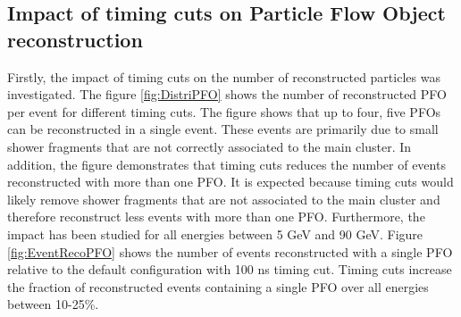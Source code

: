 \subsection{Impact of timing cuts on Particle Flow Object reconstruction}

Firstly, the impact of timing cuts on the number of reconstructed particles was investigated. The figure \ref{fig:DistriPFO} shows the number of reconstructed PFO per event for different timing cuts. The figure shows that up to four, five PFOs can be reconstructed in a single event. These events are primarily due to small shower fragments that are not correctly associated to the main cluster. In addition, the figure demonstrates that timing cuts reduces the number of events reconstructed with more than one PFO. It is expected because timing cuts would likely remove shower fragments that are not associated to the main cluster and therefore reconstruct less events with more than one PFO. Furthermore, the impact has been studied for all energies between 5 GeV and 90 GeV. Figure \ref{fig:EventRecoPFO} shows the number of events reconstructed with a single PFO relative to the default configuration with 100 ns timing cut. Timing cuts increase the fraction of reconstructed events containing a single PFO over all energies between 10-25\%.


